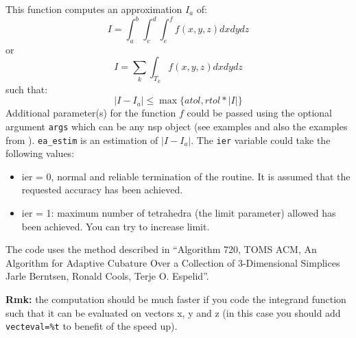 \begin{mandescription}
This function computes an approximation $I_a$ of:
$$
   I = \int_a^b \int_c^d \int_e^f f(x,y,z) dxdydz
$$
or
$$
   I = \sum_k \int_{T_k} f(x,y,z) dxdydz
$$
such that:
$$
   | I - I_a | \le  \max \{ atol ,  rtol*|I| \}
$$
Additional parameter(s) for the function $f$ could be passed using the
optional argument \verb+args+ which can be any nsp object (see
examples and also the examples from ). 
\verb+ea_estim+ is an estimation of $| I - I_a |$. The
\verb+ier+ variable could take the following values: 
\begin{itemize}
\item ier = 0,  normal and reliable termination of the routine. It is assumed that the
      requested  accuracy has been achieved.
\item ier = 1: maximum number of tetrahedra (the limit
      parameter) allowed has been achieved. You can try to
      increase limit.
\end{itemize}
 
The code uses the method described in ``Algorithm 720, TOMS ACM,
An Algorithm for Adaptive Cubature Over a Collection of 3-Dimensional Simplices
Jarle Berntsen, Ronald Cools, Terje O. Espelid''.

{\bf Rmk:} the computation should be much faster if you code the integrand function
such that it can be evaluated on vectors x, y and z (in this case you should add \verb+vecteval=%t+
to benefit of the speed up).

\end{mandescription}

